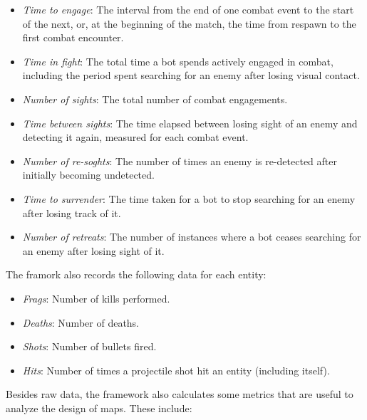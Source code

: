 \documentclass{Configuration_Files/PoliMi3i_thesis}
\begin{document}
\begin{itemize}
    \item \textit{Time to engage}: The interval from the end of one combat event to the start of the next, or, at the beginning of the match, the time from respawn to the first combat encounter.
    \item \textit{Time in fight}: The total time a bot spends actively engaged in combat, including the period spent searching for an enemy after losing visual contact.
    \item \textit{Number of sights}: The total number of combat engagements.
    \item \textit{Time between sights}: The time elapsed between losing sight of an enemy and detecting it again, measured for each combat event.
    \item \textit{Number of re-soghts}: The number of times an enemy is re-detected after initially becoming undetected.
    \item \textit{Time to surrender}: The time taken for a bot to stop searching for an enemy after losing track of it.
    \item \textit{Number of retreats}: The number of instances where a bot ceases searching for an enemy after losing sight of it.
\end{itemize}

The framork also records the following data for each entity:

\begin{itemize}
    \item \textit{Frags}: Number of kills performed. 
    \item \textit{Deaths}: Number of deaths. 
    \item \textit{Shots}: Number of bullets fired. 
    \item \textit{Hits}: Number of times a projectile shot hit an entity (including itself).
\end{itemize}

Besides raw data, the framework also calculates some metrics that are useful to analyze the design of maps. These include:
\end{document}
